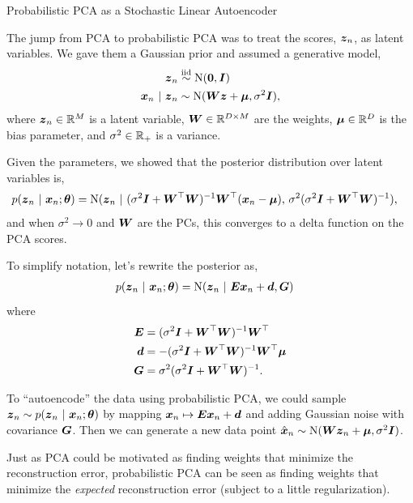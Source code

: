 \documentclass[aspectratio=169]{beamer}
\begin{document}
\begin{frame}[t,allowframebreaks]{Probabilistic PCA as a Stochastic Linear
Autoencoder}\label{probabilistic-pca-as-a-stochastic-linear-autoencoder}

The jump from PCA to probabilistic PCA was to treat the scores,
\(\boldsymbol{z}_n\), as latent variables. We gave them a Gaussian prior and
assumed a generative model, 
\begin{align*}
    \boldsymbol{z}_n &\stackrel{\text{iid}}{\sim} \mathrm{N}(\boldsymbol{0}, \boldsymbol{I}) \\
    \boldsymbol{x}_n ~\vert~ \boldsymbol{z}_n &\sim \mathrm{N}(\boldsymbol{W} \boldsymbol{z} + \boldsymbol{\mu}, \sigma^2 \boldsymbol{I}),
\end{align*} 
where \(\boldsymbol{z}_n \in \mathbb{R}^M\) is a latent variable,
\(\boldsymbol{W} \in \mathbb{R}^{D \times M}\) are the weights, \(\boldsymbol{\mu} \in \mathbb{R}^D\)
is the bias parameter, and \(\sigma^2 \in \mathbb{R}_+\) is a variance.

Given the parameters, we showed that the posterior distribution over
latent variables is, 
\begin{align*}
p(\boldsymbol{z}_n ~\vert~ \boldsymbol{x}_n; \boldsymbol{\theta})
&=
\mathrm{N}(\boldsymbol{z}_n ~\vert~ (\sigma^2 \boldsymbol{I} + \boldsymbol{W}^\top \boldsymbol{W})^{-1} \boldsymbol{W}^\top (\boldsymbol{x}_n - \boldsymbol{\mu}), \, \sigma^2 (\sigma^2 \boldsymbol{I} + \boldsymbol{W}^\top \boldsymbol{W})^{-1}),
\end{align*} 
and when \(\sigma^2 \to 0\) and \(\boldsymbol{W}\) are the PCs, this
converges to a delta function on the PCA scores.

To simplify notation, let's rewrite the posterior as, 
\begin{align*}
p(\boldsymbol{z}_n ~\vert~ \boldsymbol{x}_n; \boldsymbol{\theta})
&= \mathrm{N}(\boldsymbol{z}_n ~\vert~ \boldsymbol{E} \boldsymbol{x}_n + \boldsymbol{d}, \boldsymbol{G})
\end{align*} 
where 
\begin{align*}
\boldsymbol{E} &= (\sigma^2 \boldsymbol{I} + \boldsymbol{W}^\top \boldsymbol{W})^{-1} \boldsymbol{W}^\top \\
\boldsymbol{d} &= - (\sigma^2 \boldsymbol{I} + \boldsymbol{W}^\top \boldsymbol{W})^{-1} \boldsymbol{W}^\top \boldsymbol{\mu} \\
\boldsymbol{G} &= \sigma^2 (\sigma^2 \boldsymbol{I} + \boldsymbol{W}^\top \boldsymbol{W})^{-1}.
\end{align*}

To ``autoencode'' the data using probabilistic PCA, we could sample
\(\boldsymbol{z}_n \sim p(\boldsymbol{z}_n ~\vert~ \boldsymbol{x}_n; \boldsymbol{\theta})\) by mapping
\(\boldsymbol{x}_n \mapsto \boldsymbol{E} \boldsymbol{x}_n + \boldsymbol{d}\) and adding Gaussian noise with
covariance \(\boldsymbol{G}\). Then we can generate a new data point
\(\hat{\boldsymbol{x}}_n \sim \mathrm{N}(\boldsymbol{W} \boldsymbol{z}_n + \boldsymbol{\mu}, \sigma^2 \boldsymbol{I})\).

Just as PCA could be motivated as finding weights that minimize the
reconstruction error, probabilistic PCA can be seen as finding weights
that minimize the \emph{expected} reconstruction error (subject to a
little regularization).
\end{frame}
\end{document}
